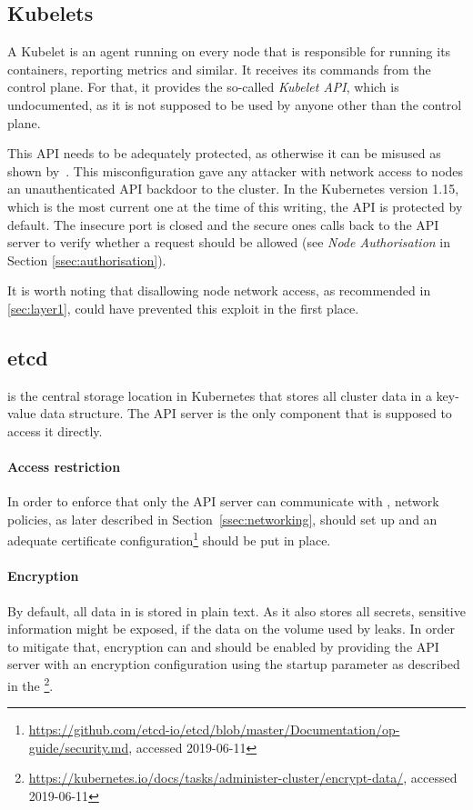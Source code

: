 \subsection{Kubelets}

A Kubelet is an agent running on every node that is responsible for running its containers, reporting metrics and similar. It receives its commands from the control plane. For that, it provides the so-called \textit{Kubelet API}, which is undocumented, as it is not supposed to be used by anyone other than the control plane. 

This API needs to be adequately protected, as otherwise it can be misused as shown by~\textcite{kubeletBackdoor}. This misconfiguration gave any attacker with network access to nodes an unauthenticated API backdoor to the cluster. In the Kubernetes version 1.15, which is the most current one at the time of this writing, the API is protected by default. The insecure port is closed and the secure ones calls back to the API server to verify whether a request should be allowed (see \textit{Node Authorisation} in Section \ref{ssec:authorisation}). 

It is worth noting that disallowing node network access, as recommended in \ref{sec:layer1}, could have prevented this exploit in the first place.

\subsection{etcd}\label{ssec:etcd}

 is the central storage location in Kubernetes that stores all cluster data in a key-value data structure. The API server is the only component that is supposed to access it directly.

\paragraph{Access restriction}
In order to enforce that only the API server can communicate with , network policies, as later described in Section~\ref{ssec:networking}, should set up and an adequate certificate configuration\footnote{\url{https://github.com/etcd-io/etcd/blob/master/Documentation/op-guide/security.md}, accessed 2019-06-11} should be put in place.

\paragraph{Encryption}
By default, all data in  is stored in plain text. As it also stores all secrets, sensitive information might be exposed, if the data on the volume used by  leaks. In order to mitigate that, encryption can and should be enabled by providing the API server with an encryption configuration using the startup parameter  as described in the \textcite{k8sdocs}\footnote{\url{https://kubernetes.io/docs/tasks/administer-cluster/encrypt-data/}, accessed 2019-06-11}.


